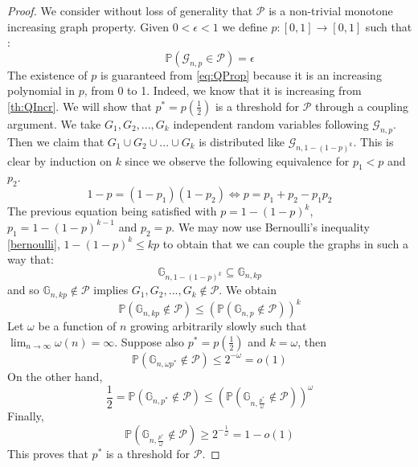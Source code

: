 \begin{proof}
	We consider without loss of generality that $\mathcal{P}$ is a non-trivial monotone increasing graph property.
	Given $0 < \epsilon < 1$ we define $p:[0,1] \to [0,1]$ such that :
	\begin{equation}
		\mathbb{P}(\mathcal{G}_{n, p} \in \mathcal{P}) = \epsilon
	\end{equation}
	The existence of $p$ is guaranteed from \eqref{eq:QProp} because it is an increasing polynomial in $p$, from 0 to 1.
	Indeed, we know that it is increasing from \eqref{th:QIncr}.
	\newline
	We will show that $p^* = p(\frac{1}{2})$ is a threshold for $\mathcal{P}$ through a coupling argument.
	We take $G_1, G_2, ..., G_k$ independent random variables following $\mathcal{G}_{n,p}$.
	Then we claim that $G_1 \cup G_2 \cup ... \cup G_k$ is distributed like $\mathcal{G}_{n, 1 - (1-p)^k}$.
	This is clear by induction on $k$ since we observe the following equivalence for $p_1 < p$ and $p_2$.
	\begin{equation}
		1 - p = (1 - p_1)(1-p_2) \iff p = p_1 + p_2 - p_1p_2
	\end{equation}
	The previous equation being satisfied with $p = 1 -(1-p)^k$, $p_1 = 1 - (1-p)^{k-1}$ and $p_2 = p$.
	\newline
	We may now use Bernoulli's inequality \eqref{bernoulli}, $1 - (1-p)^k \leq kp$ to obtain that we can couple the graphs in such a way that:
	\begin{equation}
		\mathbb{G}_{n,1 - (1-p)^k} \subseteq \mathbb{G}_{n, kp}
	\end{equation}
	and so $\mathbb{G}_{n, kp} \not\in \mathcal{P}$ implies $G_1, G_2, ..., G_k \not\in \mathcal{P}$. 
	We obtain
	\begin{equation}
		\mathbb{P}(\mathbb{G}_{n, kp} \not\in \mathcal{P}) \leq (\mathbb{P}(\mathbb{G}_{n,p}\not\in\mathcal{P}))^k
	\end{equation}
	Let $\omega$ be a function of $n$ growing arbitrarily slowly such that $\lim_{n\to\infty}\omega(n) = \infty$. 
	Suppose also $p^* = p(\frac{1}{2})$ and $k=\omega$, then
	\begin{equation}
		\mathbb{P}(\mathbb{G}_{n, \omega p^*} \not\in \mathcal{P}) \leq 2^{-\omega} = o(1)
	\end{equation}
	On the other hand,
	\begin{equation}
		\frac{1}{2} = \mathbb{P}(\mathbb{G}_{n,p^*} \not\in \mathcal{P}) \leq (\mathbb{P}(\mathbb{G}_{n, \frac{p^*}{\omega}} \not\in \mathcal{P}))^{\omega}
	\end{equation}
	Finally, 
	\begin{equation}
		\mathbb{P}(\mathbb{G}_{n, \frac{p^*}{\omega}} \not \in \mathcal{P}) \geq 2^{-\frac{1}{\omega}} = 1 -o(1)
	\end{equation}
	This proves that $p^*$ is a threshold for $\mathcal{P}$.
\end{proof}

